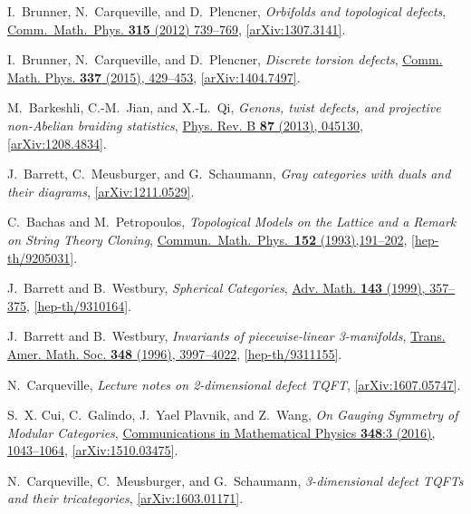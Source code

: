 \documentclass[12pt]{scrartcl}
\newcommand\doi[2]        {\href{http://dx.doi.org/#1}{#2}}
\theoremstyle{definition}
\numberwithin{equation}{section}
\numberwithin{definition}{section}
\numberwithin{figure}{section}
\begin{document}
\begin{thebibliography}{BDSPV}
I.~Brunner, N.~Carqueville, and D.~Plencner, 
\textsl{Orbifolds and topological defects}, 
\doi{10.1007/s00220-014-2056-3}{Comm.~Math.~Phys. \textbf{315} (2012) 739--769}, 
\href{http://arxiv.org/abs/1307.3141}{[\mbox{arXiv:}1307.3141]}. 

I.~Brunner, N.~Carqueville, and D.~Plencner, 
\textsl{Discrete torsion defects}, 
\doi{10.1007/s00220-015-2297-9}{Comm. Math. Phys. \textbf{337} (2015), 429--453}, 
\href{http://arxiv.org/abs/1404.7497}{[arXiv:1404.7497]}.

M.~Barkeshli, C.-M.~Jian, and X.-L.~Qi, 
\textsl{Genons, twist defects, and projective non-Abelian braiding statistics}, 
\doi{10.1103/PhysRevB.87.045130}{Phys. Rev. B \textbf{87} (2013), 045130}, 
\href{http://www.arxiv.org/abs/1208.4834}{[arXiv:1208.4834]}.

J.~Barrett, C.~Meusburger, and G.~Schaumann, 
\textsl{Gray categories with duals and their diagrams},
\href{http://arxiv.org/abs/1211.0529}{[arXiv:1211.0529]}.

C.~Bachas and M.~Petropoulos, 
\textsl{Topological Models on the Lattice and a Remark on String Theory Cloning}, 
\doi{10.1007/BF02097063}{Commun.~Math.~Phys.~\textbf{152} (1993),191--202}, 
\href{http://www.arxiv.org/abs/hep-th/9205031}{[hep-th/9205031]}.

J.~Barrett and B.~Westbury, 
\textsl{Spherical Categories}, 
\doi{10.1006/aima.1998.1800}{Adv. Math. \textbf{143} (1999), 357--375}, 
\href{http://arxiv.org/abs/hep-th/9310164}{[hep-th/9310164]}.

J.~Barrett and B.~Westbury, 
\textsl{Invariants of piecewise-linear 3-manifolds}, 
\doi{10.1090/S0002-9947-96-01660-1}{Trans. Amer. Math. Soc. \textbf{348} (1996), 3997--4022}, 
\href{http://arxiv.org/abs/hep-th/9311155}{[hep-th/9311155]}.

N.~Carqueville, 
\textsl{Lecture notes on 2-dimensional defect TQFT}, 
\href{http://arxiv.org/abs/1607.05747}{[arXiv:1607.05747]}.

S.~X. Cui, C.~Galindo, J.~Yael Plavnik, and Z.~Wang, 
\textsl{On Gauging Symmetry of Modular Categories}, 
\doi{10.1007/s00220-016-2633-8}{Communications in Mathematical Physics \textbf{348}:3 (2016), 1043--1064}, 
\href{http://arxiv.org/abs/1510.03475}{[arXiv:1510.03475]}.

N.~Carqueville, C.~Meusburger, and G.~Schaumann, 
\textsl{3-dimensional defect TQFTs and their tricategories}, 
\href{http://arxiv.org/abs/1603.01171}{[arXiv:1603.01171]}.


\end{thebibliography}
\end{document}
